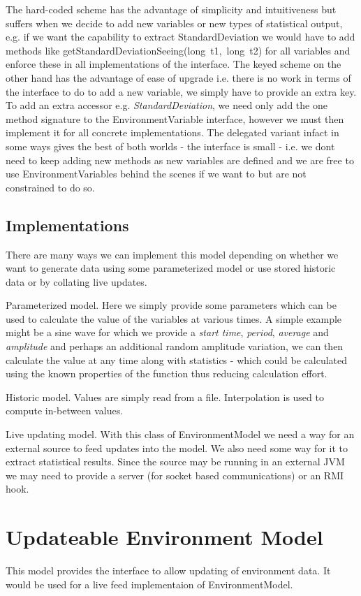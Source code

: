 The hard-coded scheme has the advantage of simplicity and intuitiveness but suffers when we decide to add new variables or new types of statistical output, e.g. if we want the capability to extract StandardDeviation we would have to add methods like \textsf{getStandardDeviationSeeing(long~t1,~long~t2)} for all variables and enforce these in all implementations of the interface. The keyed scheme on the other hand has the advantage of ease of upgrade i.e. there is no work in terms of the interface to do to add a new variable, we simply have to provide an extra key. To add an extra accessor e.g. \emph{StandardDeviation}, we need only add the one method signature to the \textsf{EnvironmentVariable} interface, however we must then implement it for all concrete implementations. The delegated variant infact in some ways gives the best of both worlds - the interface is small - i.e. we dont need to keep adding new methods as new variables are defined and we are free to use \textsf{EnvironmentVariables} behind the scenes if we want to but are not constrained to do so.

\subsection{Implementations}
There are many ways we can implement this model depending on whether we want to generate data using some parameterized model or use stored historic data or by collating live updates. 

Parameterized model.
Here we simply provide some parameters which can be used to calculate the value of the variables at various times. A simple example might be a sine wave for which we provide a \emph{start time}, \emph{period}, \emph{average} and \emph{amplitude} and perhaps an additional random amplitude variation, we can then calculate the value at any time along with statistics - which could be calculated using the known properties of the function thus reducing calculation effort.

Historic model.
Values are simply read from a file. Interpolation is used to compute in-between values.

Live updating model.
With this class of \textsf{EnvironmentModel} we need a way for an external source to feed updates into the model. We also need some way for it to extract statistical results. Since the source may be running in an external JVM we may need to provide a server (for socket based communications) or an RMI hook.


\section{Updateable Environment Model}
This model provides the interface to allow updating of environment data. It would be used for a live feed implementaion of \textsf{EnvironmentModel}.
